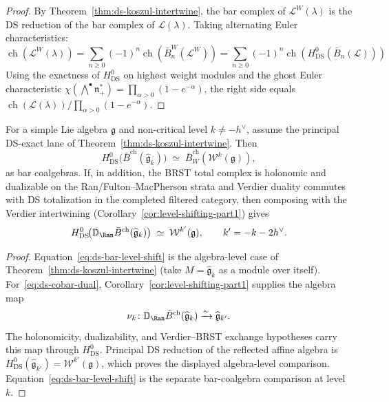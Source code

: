 \begin{proof}
By Theorem~\ref{thm:ds-koszul-intertwine}, the bar complex of
$\mathcal{L}^W(\lambda)$ is the DS reduction of the bar complex
of $\mathcal{L}(\lambda)$. Taking alternating Euler
characteristics:
\[
\operatorname{ch}(\mathcal{L}^W(\lambda))
= \sum_{n \geq 0}(-1)^n \operatorname{ch}(\bar{B}^W_n(\mathcal{L}^W))
= \sum_{n \geq 0}(-1)^n \operatorname{ch}(H^0_{\mathrm{DS}}(\bar{B}_n(\mathcal{L})))
\]
Using the exactness of $H^0_{\mathrm{DS}}$ on highest weight
modules and the ghost Euler characteristic
$\chi(\bigwedge^\bullet \mathfrak{n}_+^*) =
\prod_{\alpha > 0}(1 - e^{-\alpha})$, the right side equals
$\operatorname{ch}(\mathcal{L}(\lambda)) /
\prod_{\alpha > 0}(1 - e^{-\alpha})$.
\end{proof}

\begin{corollary}
\label{cor:ds-bar-level-shift}
For a simple Lie algebra $\mathfrak{g}$ and non-critical level
$k \neq -h^\vee$, assume the principal DS-exact lane of
Theorem~\ref{thm:ds-koszul-intertwine}. Then
\begin{equation}\label{eq:ds-bar-level-shift}
H^0_{\mathrm{DS}}\bigl(\bar{B}^{\mathrm{ch}}(\widehat{\mathfrak{g}}_k)\bigr) \;\simeq\; \bar{B}_W^{\mathrm{ch}}(\mathcal{W}^k(\mathfrak{g})),
\end{equation}
as bar coalgebras. If, in addition, the BRST total complex is
holonomic and dualizable on the Ran/Fulton--MacPherson strata and
Verdier duality commutes with DS totalization in the completed
filtered category, then composing with the Verdier intertwining
\textup{(}Corollary~\textup{\ref{cor:level-shifting-part1})} gives
\begin{equation}\label{eq:ds-cobar-dual}
H^0_{\mathrm{DS}}\!\bigl(
 \mathbb{D}_{\Ran}\bar{B}^{\mathrm{ch}}(\widehat{\mathfrak{g}}_k)\bigr)
 \;\simeq\;
 \mathcal{W}^{k'}(\mathfrak{g}),
 \qquad k' = -k - 2h^\vee.
\end{equation}
\end{corollary}

\begin{proof}
Equation~\eqref{eq:ds-bar-level-shift} is the algebra-level case of
Theorem~\ref{thm:ds-koszul-intertwine} (take
$M = \widehat{\mathfrak{g}}_k$ as a module over itself).
For~\eqref{eq:ds-cobar-dual},
Corollary~\ref{cor:level-shifting-part1} supplies the algebra map
\[
 \nu_k\colon
 \mathbb{D}_{\Ran}\bar{B}^{\mathrm{ch}}(\widehat{\mathfrak{g}}_k)
 \xrightarrow{\sim}\widehat{\mathfrak{g}}_{k'}.
\]
The holonomicity, dualizability, and Verdier--BRST exchange hypotheses
carry this map through $H^0_{\mathrm{DS}}$.  Principal DS reduction of
the reflected affine algebra is
$H^0_{\mathrm{DS}}(\widehat{\mathfrak g}_{k'})
=\mathcal W^{k'}(\mathfrak g)$, which proves the displayed
algebra-level comparison.  Equation~\eqref{eq:ds-bar-level-shift}
is the separate bar-coalgebra comparison at level~$k$.
\end{proof}



